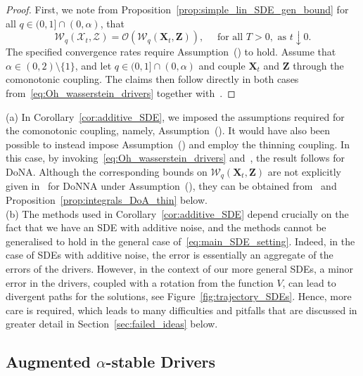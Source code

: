 \documentclass[en,oneside,bbfont,article]{amsart}
\theoremstyle{remark}
\newenvironment{remark}
    {\pushQED{\qed}\renewcommand{\qedsymbol}{$\Diamond$}\remarkx}
    {\popQED\endremarkx}
\theoremstyle{definition}
\theoremstyle{definition}
\newcommand\X{\bm{\mathcal{X}}}
\newcommand\ZZ{\bm{\mathcal{Z}}}
\newcommand{\mW}{\mathcal{W}}
\newcommand\1{\mathds{1}}
\newcommand\Oh{\mathcal{O}}
\newcommand\da{\downarrow}
\begin{document}
\begin{proof}
First, we note from Proposition~\ref{prop:simple_lin_SDE_gen_bound} for all $q \in (0,1]\cap(0,\alpha)$, that
\begin{equation}
\label{eq:Oh_wasserstein_drivers}
\mW_q(\X_t,\ZZ) = \Oh(\mW_q(\bm{X}_t,\bm{Z})), \quad \text{ for all }T>0, \text{ as }t \da 0.
\end{equation}
The specified convergence rates require Assumption~() to hold. Assume that $\alpha \in (0,2)\setminus\{1\}$, and let $q \in (0,1]\cap(0,\alpha)$ and couple $\bm{X}_t$ and $\bm{Z}$ through the comonotonic coupling. The claims then follow directly in both cases from~\eqref{eq:Oh_wasserstein_drivers} together with~\cite[Prop.~2.3 \& Thm~2.5]{WassersteinPaper}.
\end{proof}

\begin{remark}
(a) In Corollary~\ref{cor:additive_SDE}, we imposed the assumptions required for the comonotonic coupling, namely, Assumption~(). It would have also been possible to instead impose Assumption~() and employ the thinning coupling. In this case, by invoking~\eqref{eq:Oh_wasserstein_drivers} and~\cite[Thm~2.2]{WassersteinPaper}, the result follows for DoNA. Although the corresponding bounds on $\mW_q(\bm{X}_t, \bm{Z})$ are not explicitly given in~\cite{WassersteinPaper} for DoNNA under Assumption~(), they can be obtained from~\cite[Prop.~3.2]{WassersteinPaper} and Proposition~\ref{prop:integrals_DoA_thin} below.\\
(b) The methods used in Corollary~\ref{cor:additive_SDE} depend crucially on the fact that we have an SDE with additive noise, and the methods cannot be generalised to hold in the general case of~\eqref{eq:main_SDE_setting}. Indeed, in the case of SDEs with additive noise, the error is essentially an aggregate of the errors of the drivers. However, in the context of our more general SDEs, a minor error in the drivers, coupled with a rotation from the function $V$, can lead to divergent paths for the solutions, see Figure~\ref{fig:trajectory_SDEs}. Hence, more care is required, which leads to many difficulties and pitfalls that are discussed in greater detail in Section~\ref{sec:failed_ideas} below.
\end{remark}



\subsection{Augmented \texorpdfstring{$\alpha$}{alpha}-stable Drivers}\label{subsec:augment_stable}
\end{document}
